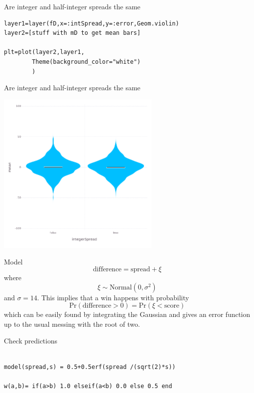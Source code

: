 \documentclass{beamer}
\begin{document}
\begin{frame}[fragile]{Are integer and half-integer spreads the same}
  \begin{lstlisting}
layer1=layer(fD,x=:intSpread,y=:error,Geom.violin)
layer2=[stuff with mD to get mean bars]

plt=plot(layer2,layer1,
        Theme(background_color="white")
        )
\end{lstlisting}
\end{frame}


\begin{frame}{Are integer and half-integer spreads the same}
  \begin{center}
  \includegraphics[width=8cm]{integerSpread.png}
\end{center}
  \end{frame}

\begin{frame}{Model}
\color{reddish}
  $$\mbox{difference} = \mbox{spread} + \xi$$
\color{black}where\color{reddish}
$$\xi\sim\mbox{Normal}(0,\sigma^2)$$
\color{black}and\color{reddish}{} $\sigma=14$\color{black}. This implies that a win happens with probability\color{reddish}
$$\mbox{Pr}(\mbox{difference}>0)=\mbox{Pr}(\xi<\mbox{score})$$
\color{black}which can be easily found by integrating the Gaussian and gives an error function up to the usual messing with the root of two.
\end{frame}


\begin{frame}[fragile]{Check predictions}
  \begin{lstlisting}

model(spread,s) = 0.5+0.5erf(spread /(sqrt(2)*s))

w(a,b)= if(a>b) 1.0 elseif(a<b) 0.0 else 0.5 end
    
\end{lstlisting}
\end{frame}
\end{document}
